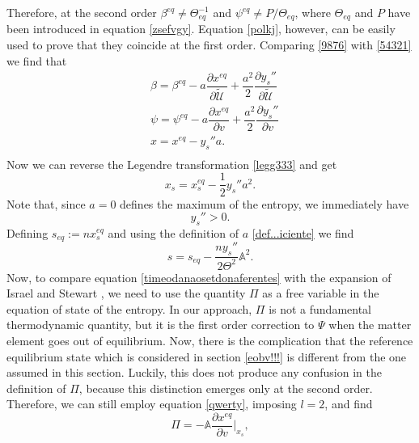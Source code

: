 \documentclass[useAMS,usenatbib,prd,twocolumn,nofootinbib]{revtex4-1}
\begin{document}
Therefore, at the second order $\beta^{eq} \neq \Theta_{eq}^{-1}$ and $\psi^{eq} \neq P/ \Theta_{eq}$, where $\Theta_{eq}$ and $P$ have been introduced in equation \eqref{zsefvgy}. 
Equation \eqref{polkj}, however, can be easily used to prove that they coincide at the first order. Comparing \eqref{9876} with \eqref{54321} we find that
\begin{equation}\label{machesbatti}
\begin{split}
& \beta = \beta^{eq} - a \dfrac{\partial x^{eq}}{\partial \tilde{\mathcal{U}}} + \dfrac{a^2}{2} \dfrac{\partial y_s''}{\partial \tilde{\mathcal{U}}} \\
& \psi = \psi^{eq} - a \dfrac{\partial x^{eq}}{\partial v} + \dfrac{a^2}{2} \dfrac{\partial y_s''}{\partial v} \\
& x = x^{eq} - y_s'' a . \\
\end{split}
\end{equation}
Now we can reverse the Legendre transformation \eqref{legg333} and get
\begin{equation}\label{polkj2}
x_s = x_s^{eq} - \dfrac{1}{2} y_s'' a^2 .
\end{equation}
Note that, since $a=0$ defines the maximum of the entropy, we immediately have
\begin{equation}
y_s'' >0 .
\end{equation}
Defining $s_{eq}:= nx_s^{eq}$ and using the definition of $a$ \eqref{def...iciente} we find
\begin{equation}\label{timeodanaosetdonaferentes}
s = s_{eq} - \dfrac{n y_s''}{2 \Theta^2} \mathbb{A}^2 .
\end{equation}
Now, to compare equation \eqref{timeodanaosetdonaferentes} with the expansion of Israel and Stewart \citep{andersson2007review}, we need to use the quantity $\Pi$ as a free variable in the equation of state of the entropy. 
In our approach, $\Pi$ is not a fundamental thermodynamic quantity, but it is the first order correction to $\Psi$ when the matter element goes out of equilibrium. Now, there is the complication that the reference equilibrium state which is considered in section \ref{eobv!!!} is different from the one assumed in this section. Luckily, this does not produce any confusion in the definition of $\Pi$, because this distinction emerges only at the second order. Therefore, we can still employ equation \eqref{qwerty}, imposing $l=2$, and find
 \begin{equation}\label{viscstrwiw}
\Pi = -\mathbb{A} \dfrac{\partial x^{eq}}{\partial v} \bigg|_{x_s},
\end{equation}
\end{document}
